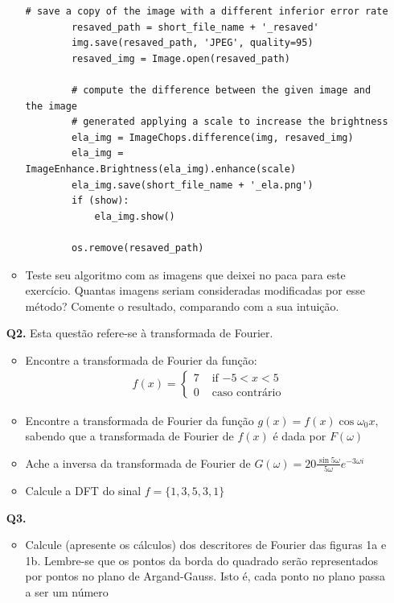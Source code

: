 \documentclass[12pt]{article}
\begin{document}
\begin{itemize}
\begin{itemize}
\begin{lstlisting}[basicstyle=\ttfamily]
        # save a copy of the image with a different inferior error rate
        resaved_path = short_file_name + '_resaved'
        img.save(resaved_path, 'JPEG', quality=95)
        resaved_img = Image.open(resaved_path)
        
        # compute the difference between the given image and the image
        # generated applying a scale to increase the brightness
        ela_img = ImageChops.difference(img, resaved_img)
        ela_img = ImageEnhance.Brightness(ela_img).enhance(scale)
        ela_img.save(short_file_name + '_ela.png')
        if (show):
            ela_img.show()
        
        os.remove(resaved_path)
    \end{lstlisting}

\item Teste seu algoritmo com as imagens que deixei no paca para este exercício. 
Quantas imagens seriam consideradas modificadas por esse método? Comente o resultado,
comparando com a sua intuição.
\end{itemize}
%
%
%
\item[{\bf Q2.}] Esta questão refere-se à transformada de Fourier.
\begin{itemize}
\item Encontre a transformada de Fourier da função:
\begin{eqnarray*}
f(x) = \left\{ \begin{array}{rl} 
 7 &\mbox{ if $-5 < x < 5$} \\
 0 &\mbox{ caso contrário}
       \end{array} \right.
\end{eqnarray*}
\item Encontre a transformada de Fourier da função $ g(x) = f(x)\cos
   \omega_0 x$, sabendo que a transformada de Fourier de $f(x)$ é dada
   por $F(\omega)$
\item Ache a inversa da transformada de Fourier de $G(\omega) =
  20\frac{\sin 5\omega}{5\omega}e^{-3\omega i}$
\item Calcule a DFT do sinal $f = \{1,3,5,3,1\}$
\end{itemize}
%
%
%
\item[{\bf Q3.}] 
\begin{itemize}
\item Calcule (apresente os cálculos) dos descritores de Fourier das
  figuras 1a e 1b. Lembre-se que os pontos da
  borda do quadrado serão representados por pontos no plano de
  Argand-Gauss. Isto é, cada ponto no plano passa a ser um número

\end{itemize}
\end{itemize}
\end{document}
